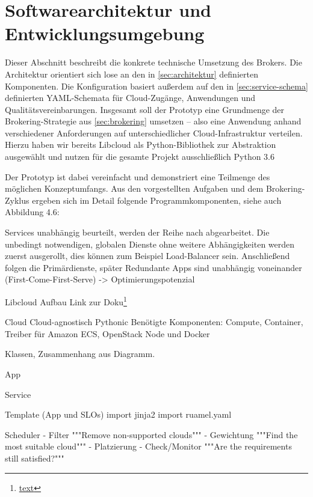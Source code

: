 \section{Softwarearchitektur und Entwicklungsumgebung}

Dieser Abschnitt beschreibt die konkrete technische Umsetzung des Brokers. Die Architektur orientiert sich lose an den in \autoref{sec:architektur} definierten Komponenten. Die Konfiguration basiert außerdem auf den in \autoref{sec:service-schema} definierten YAML-Schemata für Cloud-Zugänge, Anwendungen und Qualitätsvereinbarungen. Insgesamt soll der Prototyp eine Grundmenge der Brokering-Strategie aus \autoref{sec:brokering} umsetzen --  also eine Anwendung anhand verschiedener Anforderungen auf unterschiedlicher Cloud-Infrastruktur verteilen. Hierzu haben wir bereits Libcloud als Python-Bibliothek zur Abstraktion ausgewählt und nutzen für die gesamte Projekt ausschließlich Python 3.6

Der Prototyp ist dabei vereinfacht und demonstriert eine Teilmenge des möglichen Konzeptumfangs. Aus den vorgestellten Aufgaben und dem Brokering-Zyklus ergeben sich im Detail folgende Programmkomponenten, siehe auch Abbildung 4.6:

Services unabhängig beurteilt, werden der Reihe nach abgearbeitet. Die unbedingt notwendigen, globalen Dienste ohne weitere Abhängigkeiten werden zuerst ausgerollt, dies können zum Beispiel Load-Balancer sein. Anschließend folgen die Primärdienste, später Redundante 
Apps sind unabhängig voneinander (First-Come-First-Serve) -> Optimierungspotenzial


Libcloud Aufbau
Link zur Doku\footnote{\url{text}}

Cloud
Cloud-agnostisch Pythonic
Benötigte Komponenten: Compute, Container, Treiber für Amazon ECS, OpenStack Node und Docker


Klassen, Zusammenhang aus Diagramm.


App

Service

Template (App und SLOs)
import jinja2
import ruamel.yaml

Scheduler
- Filter     """Remove non-supported clouds"""
- Gewichtung """Find the most suitable cloud"""
- Platzierung
- Check/Monitor """Are the requirements still satisfied?"""



